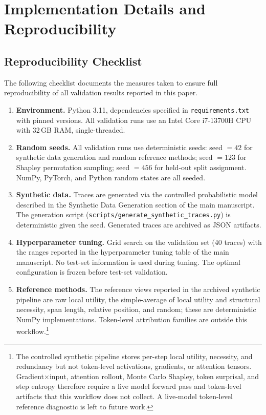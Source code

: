 \documentclass[pdflatex,sn-mathphys-num]{sn-jnl}
\begin{document}
\section{Implementation Details and Reproducibility}
\label{app:implementation}

\subsection{Reproducibility Checklist}
\label{app:repro-checklist}

The following checklist documents the measures taken to ensure full reproducibility of all validation results reported in this paper.

\begin{enumerate}
\item \textbf{Environment.} Python 3.11, dependencies specified in \texttt{requirements.txt} with pinned versions. All validation runs use an Intel Core i7-13700H CPU with 32\,GB RAM, single-threaded.
\item \textbf{Random seeds.} All validation runs use deterministic seeds: seed $= 42$ for synthetic data generation and random reference methods; seed $= 123$ for Shapley permutation sampling; seed $= 456$ for held-out split assignment. NumPy, PyTorch, and Python random states are all seeded.
\item \textbf{Synthetic data.} Traces are generated via the controlled probabilistic model described in the Synthetic Data Generation section of the main manuscript. The generation script (\texttt{scripts/generate\_synthetic\_traces.py}) is deterministic given the seed. Generated traces are archived as JSON artifacts.
\item \textbf{Hyperparameter tuning.} Grid search on the validation set (40 traces) with the ranges reported in the hyperparameter tuning table of the main manuscript. No test-set information is used during tuning. The optimal configuration is frozen before test-set validation.
\item \textbf{Reference methods.} The reference views reported in the archived synthetic pipeline are raw local utility, the simple-average of local utility and structural necessity, span length, relative position, and random; these are deterministic NumPy implementations. Token-level attribution families are outside this workflow.\footnote{The controlled synthetic pipeline stores per-step local utility, necessity, and redundancy but not token-level activations, gradients, or attention tensors. Gradient$\times$input, attention rollout, Monte Carlo Shapley, token surprisal, and step entropy therefore require a live model forward pass and token-level artifacts that this workflow does not collect. A live-model token-level reference diagnostic is left to future work.}

\end{enumerate}
\end{document}
